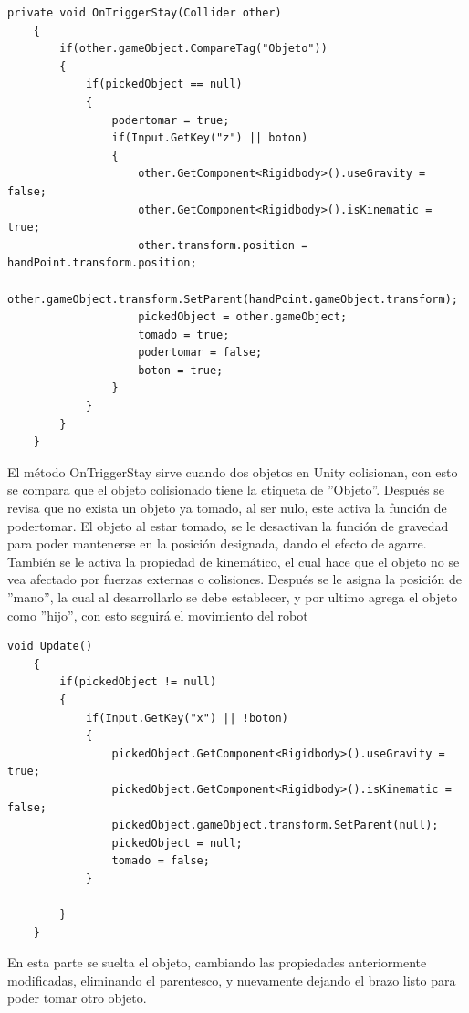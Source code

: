 \begin{lstlisting}[frame=single]
    private void OnTriggerStay(Collider other)
    {
        if(other.gameObject.CompareTag("Objeto"))
        {
            if(pickedObject == null)
            {
                podertomar = true;
                if(Input.GetKey("z") || boton)
                {
                    other.GetComponent<Rigidbody>().useGravity = false;
                    other.GetComponent<Rigidbody>().isKinematic = true;
                    other.transform.position = handPoint.transform.position;
                    other.gameObject.transform.SetParent(handPoint.gameObject.transform);
                    pickedObject = other.gameObject;
                    tomado = true;
                    podertomar = false;
                    boton = true;
                }
            }
        }
    }
\end{lstlisting}
El método OnTriggerStay sirve cuando dos objetos en Unity colisionan, con esto se compara que el objeto colisionado tiene la etiqueta de ''Objeto''.
Después se revisa que no exista un objeto ya tomado, al ser nulo, este activa la función de podertomar.
El objeto al estar tomado, se le desactivan la función de gravedad para poder mantenerse en la posición designada, dando el efecto de agarre.
También se le activa la propiedad de kinemático, el cual hace que el objeto no se vea afectado por fuerzas externas o colisiones.
Después se le asigna la posición de ''mano'', la cual al desarrollarlo se debe establecer, y por ultimo agrega el objeto como ''hijo'', con esto seguirá el movimiento del robot

\begin{lstlisting}[frame=single]
    void Update()
    {
        if(pickedObject != null)
        {
            if(Input.GetKey("x") || !boton)
            {
                pickedObject.GetComponent<Rigidbody>().useGravity = true;
                pickedObject.GetComponent<Rigidbody>().isKinematic = false;
                pickedObject.gameObject.transform.SetParent(null);
                pickedObject = null;
                tomado = false;
            }
            
        }
    }
\end{lstlisting}

En esta parte se suelta el objeto, cambiando las propiedades anteriormente modificadas, eliminando el parentesco, y nuevamente dejando el brazo listo para poder tomar otro objeto.
